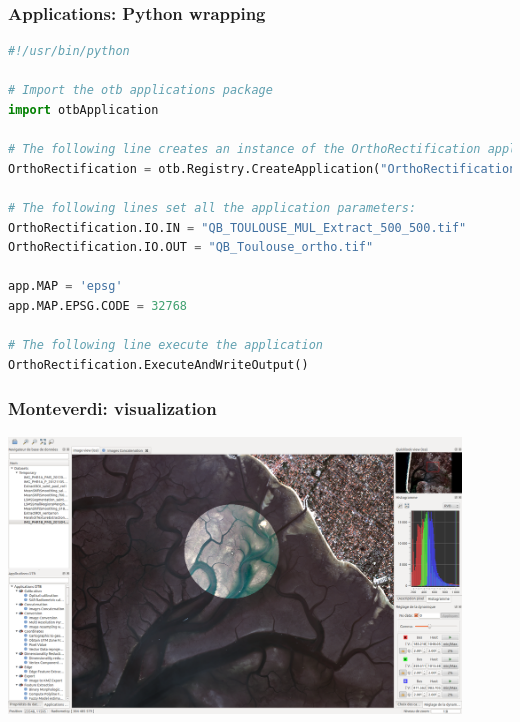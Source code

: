 \documentclass[8pt]{beamer}
\begin{document}
\begin{frame}[fragile]
\frametitle{Applications: Python wrapping}
\begin{lstlisting}[language=python,breaklines=true,breakatwhitespace=true,frame
    = tb,framerule =
    0.25pt,fontadjust,backgroundcolor={\color{listlightgray}},basicstyle =
    {\ttfamily\tiny},keywordstyle =
    {\ttfamily\color{listkeyword}\textbf},identifierstyle =
    {\ttfamily},commentstyle = {\ttfamily\color{listcomment}\textit},stringstyle
    = {\ttfamily},showstringspaces = false,showtabs = false,numbers =
    none,numbersep = 6pt, numberstyle={\ttfamily\color{listnumbers}},tabsize =
    2]
#!/usr/bin/python

# Import the otb applications package
import otbApplication

# The following line creates an instance of the OrthoRectification application
OrthoRectification = otb.Registry.CreateApplication("OrthoRectification")

# The following lines set all the application parameters:
OrthoRectification.IO.IN = "QB_TOULOUSE_MUL_Extract_500_500.tif"
OrthoRectification.IO.OUT = "QB_Toulouse_ortho.tif"

app.MAP = 'epsg'
app.MAP.EPSG.CODE = 32768

# The following line execute the application
OrthoRectification.ExecuteAndWriteOutput()
\end{lstlisting}
\end{frame}


\begin{frame}
\frametitle{Monteverdi: visualization}
\begin{minipage}[t][6cm][t]{\textwidth}
\begin{center}
\includegraphics[width=0.9\textwidth]{images/monteverdi2-loupe.png}
\end{center}
\end{minipage}
\end{frame}
\end{document}
